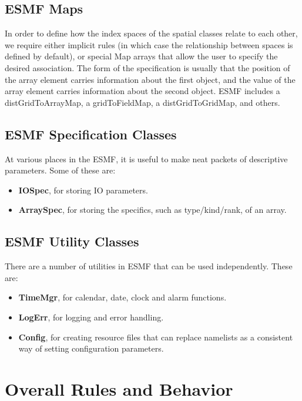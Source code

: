 \subsection{ESMF Maps}

In order to define how the index spaces of the spatial classes relate
to each other, we require either implicit rules (in which case the
relationship between spaces is defined by default), or special Map arrays
that allow the user to specify the desired association.  The form of the 
specification is usually that the position of the array element carries
information about the first object, and the value of the array element carries
information about the second object.  ESMF includes a distGridToArrayMap,
a gridToFieldMap, a distGridToGridMap, and others.


\subsection{ESMF Specification Classes}

At various places in the ESMF, it is useful to make neat packets
of descriptive parameters.  Some of these are:
\begin{itemize}
\item {\bf IOSpec}, for storing IO parameters.
\item {\bf ArraySpec}, for storing the specifics, such as type/kind/rank,
of an array.
\end{itemize}

\subsection{ESMF Utility Classes}

There are a number of utilities in ESMF that can be used independently.
These are:
\begin{itemize}
\item {\bf TimeMgr}, for calendar, date, clock and alarm functions.
\item {\bf LogErr}, for logging and error handling.
\item {\bf Config}, for creating resource files that can replace namelists
as a consistent way of setting configuration parameters.
\end{itemize}

\section{Overall Rules and Behavior}

